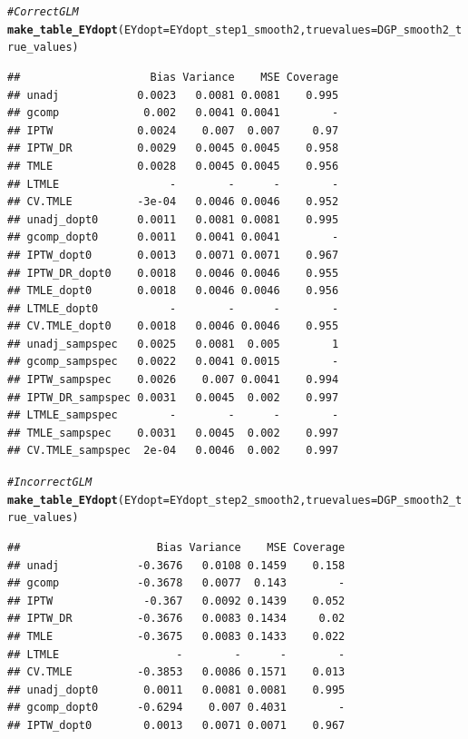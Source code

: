 \documentclass[11pt]{article}\usepackage[]{graphicx}\usepackage[]{color}
\makeatletter
\newcommand{\hlcom}[1]{\textcolor[rgb]{0.678,0.584,0.686}{\textit{#1}}}%
\newcommand{\hlstd}[1]{\textcolor[rgb]{0.345,0.345,0.345}{#1}}%
\newcommand{\hlkwc}[1]{\textcolor[rgb]{0.333,0.667,0.333}{#1}}%
\newcommand{\hlkwd}[1]{\textcolor[rgb]{0.737,0.353,0.396}{\textbf{#1}}}%
\newenvironment{kframe}{%
 \def\at@end@of@kframe{}%
 \ifinner\ifhmode%
  \def\at@end@of@kframe{\end{minipage}}%
  \begin{minipage}{\columnwidth}%
 \fi\fi%
 \def\FrameCommand##1{\hskip\@totalleftmargin \hskip-\fboxsep
 \colorbox{shadecolor}{##1}\hskip-\fboxsep
     \hskip-\linewidth \hskip-\@totalleftmargin \hskip\columnwidth}%
 \MakeFramed {\advance\hsize-\width
   \@totalleftmargin\z@ \linewidth\hsize
   \@setminipage}}%
 {\par\unskip\endMakeFramed%
 \at@end@of@kframe}
\newenvironment{knitrout}{}{} %
\makeatother
\begin{document}
\begin{knitrout}
\color{fgcolor}\begin{kframe}
\begin{alltt}
\hlcom{# Correct GLM}
\hlkwd{make_table_EYdopt}\hlstd{(}\hlkwc{EYdopt} \hlstd{= EYdopt_step1_smooth2,} \hlkwc{truevalues} \hlstd{= DGP_smooth2_true_values)}
\end{alltt}
\begin{verbatim}
##                    Bias Variance    MSE Coverage
## unadj            0.0023   0.0081 0.0081    0.995
## gcomp             0.002   0.0041 0.0041        -
## IPTW             0.0024    0.007  0.007     0.97
## IPTW_DR          0.0029   0.0045 0.0045    0.958
## TMLE             0.0028   0.0045 0.0045    0.956
## LTMLE                 -        -      -        -
## CV.TMLE          -3e-04   0.0046 0.0046    0.952
## unadj_dopt0      0.0011   0.0081 0.0081    0.995
## gcomp_dopt0      0.0011   0.0041 0.0041        -
## IPTW_dopt0       0.0013   0.0071 0.0071    0.967
## IPTW_DR_dopt0    0.0018   0.0046 0.0046    0.955
## TMLE_dopt0       0.0018   0.0046 0.0046    0.956
## LTMLE_dopt0           -        -      -        -
## CV.TMLE_dopt0    0.0018   0.0046 0.0046    0.955
## unadj_sampspec   0.0025   0.0081  0.005        1
## gcomp_sampspec   0.0022   0.0041 0.0015        -
## IPTW_sampspec    0.0026    0.007 0.0041    0.994
## IPTW_DR_sampspec 0.0031   0.0045  0.002    0.997
## LTMLE_sampspec        -        -      -        -
## TMLE_sampspec    0.0031   0.0045  0.002    0.997
## CV.TMLE_sampspec  2e-04   0.0046  0.002    0.997
\end{verbatim}
\begin{alltt}
\hlcom{# Incorrect GLM}
\hlkwd{make_table_EYdopt}\hlstd{(}\hlkwc{EYdopt} \hlstd{= EYdopt_step2_smooth2,} \hlkwc{truevalues} \hlstd{= DGP_smooth2_true_values)}
\end{alltt}
\begin{verbatim}
##                     Bias Variance    MSE Coverage
## unadj            -0.3676   0.0108 0.1459    0.158
## gcomp            -0.3678   0.0077  0.143        -
## IPTW              -0.367   0.0092 0.1439    0.052
## IPTW_DR          -0.3676   0.0083 0.1434     0.02
## TMLE             -0.3675   0.0083 0.1433    0.022
## LTMLE                  -        -      -        -
## CV.TMLE          -0.3853   0.0086 0.1571    0.013
## unadj_dopt0       0.0011   0.0081 0.0081    0.995
## gcomp_dopt0      -0.6294    0.007 0.4031        -
## IPTW_dopt0        0.0013   0.0071 0.0071    0.967

\end{verbatim}
\end{kframe}
\end{knitrout}
\end{document}
